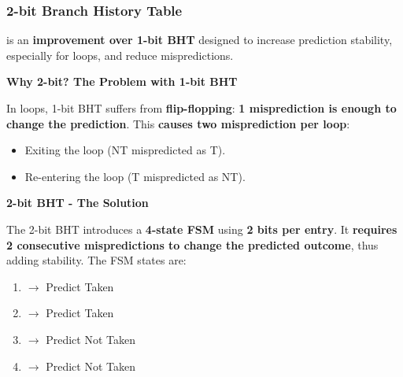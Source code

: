 \subsubsection{2-bit Branch History Table}

 is an \textbf{improvement over 1-bit BHT} designed to increase prediction stability, especially for loops, and reduce mispredictions.

\highspace
\begin{flushleft}
    \textcolor{Green3}{ \textbf{Why 2-bit? The Problem with 1-bit BHT}}
\end{flushleft}
In loops, 1-bit BHT suffers from \textbf{flip-flopping}: \textbf{1 misprediction is enough to change the prediction}. This \textcolor{Red2}{\textbf{causes two misprediction per loop}}:
\begin{itemize}
    \item Exiting the loop (NT mispredicted as T).
    \item Re-entering the loop (T mispredicted as NT).
\end{itemize}

\highspace
\begin{flushleft}
    \textcolor{Green3}{ \textbf{2-bit BHT - The Solution}}
\end{flushleft}
The 2-bit BHT introduces a \textbf{4-state FSM} using \textbf{2 bits per entry}. It \textbf{requires 2 consecutive mispredictions to change the predicted outcome}, thus adding stability. The FSM states are:
\begin{enumerate}
    \item {} $\rightarrow$ Predict Taken
    \item {} $\rightarrow$ Predict Taken
    \item {} $\rightarrow$ Predict Not Taken
    \item {} $\rightarrow$ Predict Not Taken
\end{enumerate}


